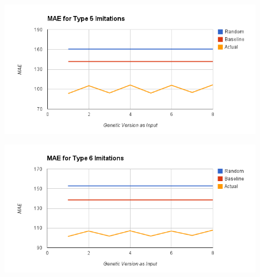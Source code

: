 \begin{figure}[center]
	\centering
	\includegraphics[width=16cm]{images/error_type_5_imitations.png}
	\caption{}
	\label{fig:c5}
\end{figure}
\begin{figure}[center]
	\centering
	\includegraphics[width=16cm]{images/error_type_6_imitations.png}
	\caption{}
	\label{fig:c6}
\end{figure}
